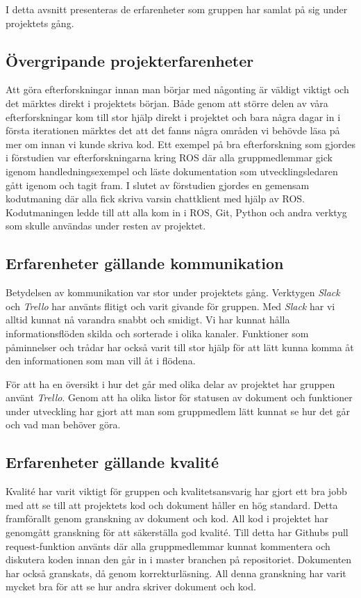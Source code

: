 I detta avsnitt presenteras de erfarenheter som gruppen har samlat på sig under projektets gång.

\subsection{Övergripande projekterfarenheter}

Att göra efterforskningar innan man börjar med någonting är väldigt viktigt och det märktes direkt i projektets början. Både genom att större delen av våra efterforskningar kom till stor hjälp direkt i projektet och bara några dagar in i första iterationen märktes det att det fanns några områden vi behövde läsa på mer om innan vi kunde skriva kod. Ett exempel på bra efterforskning som gjordes i förstudien var efterforskningarna kring ROS där alla gruppmedlemmar gick igenom handledningsexempel och läste dokumentation som utvecklingsledaren gått igenom och tagit fram. I slutet av förstudien gjordes en gemensam kodutmaning där alla fick skriva varsin chattklient med hjälp av ROS. Kodutmaningen ledde till att alla kom in i ROS, Git, Python och andra verktyg som skulle användas under resten av projektet.


\subsection{Erfarenheter gällande kommunikation}

Betydelsen av kommunikation var stor under projektets gång. Verktygen \textit{Slack} och \textit{Trello} har använts flitigt och varit givande för gruppen. Med \textit{Slack} har vi alltid kunnat nå varandra snabbt och smidigt. Vi har kunnat hålla informationsflöden skilda och sorterade i olika kanaler. Funktioner som påminnelser och trådar har också varit till stor hjälp för att lätt kunna komma åt den informationen som man vill åt i flödena.

För att ha en översikt i hur det går med olika delar av projektet har gruppen använt \textit{Trello}. Genom att ha olika listor för statusen av dokument och funktioner under utveckling har gjort att man som gruppmedlem lätt kunnat se hur det går och vad man behöver göra.


\subsection{Erfarenheter gällande kvalité}

Kvalité har varit viktigt för gruppen och kvalitetsansvarig har gjort ett bra jobb med att se till att projektets kod och dokument håller en hög standard. Detta framförallt genom granskning av dokument och kod. All kod i projektet har genomgått granskning för att säkerställa god kvalité. Till detta har Githubs pull request-funktion använts där alla gruppmedlemmar kunnat kommentera och diskutera koden innan den går in i master branchen på repositoriet. Dokumenten har också granskats, då genom korrekturläsning. All denna granskning har varit mycket bra för att se hur andra skriver dokument och kod.


